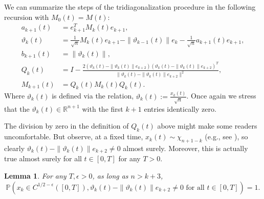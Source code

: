 \documentclass{amsart}
\newtheorem{lm}[thm]{Lemma}
\numberwithin{equation}{section}
\newcommand{\pr}{\mathbb{P}}
\newcommand{\R}{\mathbb{R}}
\begin{document}
We can summarize the steps of the tridiagonalization procedure in the following recursion with $M_0(t) = M(t)$:
\begin{equation}
    \begin{split}
        a_{k+1}(t)&=e_{k+1}^T M_k(t)e_{k+1},\\
        \vartheta_{k}(t)&=\frac{1}{\sqrt{n}}M_k(t)e_{k+1}-\|\vartheta_{k-1}(t)\|e_k-\frac{1}{\sqrt{n}}a_{k+1}(t)e_{k+1},\\
        b_{k+1}(t) &= \|\vartheta_k(t)\|,\\
        Q_k(t)&=I-\frac{2(\vartheta_k(t)-\|\vartheta_k(t)\|e_{k+2})(\vartheta_k(t)-\|\vartheta_k(t)\|e_{k+2})^T}{\|\vartheta_k(t)-\|\vartheta_k(t)\|e_{k+2}\|^2},\\
        M_{k+1}(t) &= Q_k(t)M_k(t)Q_k(t).
    \end{split}
\end{equation}
Where $\vartheta_k(t)$ is defined via the relation, $\vartheta_k(t):=\frac{x_k(t)}{\sqrt{n}}$. Once again we stress that the $\vartheta_k(t) \in \R^{n+1}$ with the first $k+1$ entries identically zero.

The division by zero in the definition of $Q_k(t)$ above might make some readers uncomfortable. But observe, at a fixed time, $x_k(t) \sim \chi_{n+1-k}$ (e.g., see \cite{DuEd02}), so clearly $\vartheta_k(t)-\|\vartheta_k(t)\|e_{k+2} \neq 0$ almost surely. Moreover, this is actually true almost surely for all $t \in [0,T]$ for any $T>0$.

\begin{lm}
    For any $T,\epsilon>0$, as long as $n>k+3$,
    \begin{equation}
        \pr\left(x_k \in C^{1/2-\epsilon}([0,T]), \vartheta_k(t)-\|\vartheta_k(t)\|e_{k+2} \neq 0 \text{ for all } t \in [0,T]\right)=1.
    \end{equation}
\end{lm}
\end{document}
